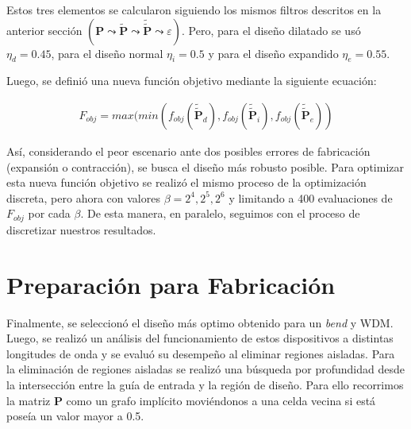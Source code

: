 Estos tres elementos se calcularon siguiendo los mismos filtros descritos en la anterior sección
$(\boldsymbol{P} \mathrel{\leadsto} \widetilde{\boldsymbol{P}} \mathrel{\leadsto}
\widetilde{\widetilde{\boldsymbol{P}}} \mathrel{\leadsto} \varepsilon)$.
Pero, para el diseño dilatado se usó $\eta_d = 0.45$, para el diseño normal $\eta_i = 0.5$ y
para el diseño expandido $\eta_e = 0.55$.

Luego, se definió una nueva función objetivo mediante la siguiente ecuación:

\begin{equation}
  \begin{split}
    F_{obj} = max(min(
    f_{obj}(\widetilde{\widetilde{\boldsymbol{P}}}_{d}),
    f_{obj}(\widetilde{\widetilde{\boldsymbol{P}}}_{i}),
    f_{obj}(\widetilde{\widetilde{\boldsymbol{P}}}_{e})
    )
  \end{split}
  \label{eq:final-fom}
\end{equation}

Así, considerando el peor escenario ante dos posibles errores de fabricación (expansión o contracción),
se busca el diseño más robusto posible.
Para optimizar esta nueva función objetivo se realizó el mismo proceso de la optimización discreta, pero ahora
con valores $\beta = 2^4, 2^5, 2^6$ y limitando a 400 evaluaciones de $F_{obj}$ por cada $\beta$. 
De esta manera, en paralelo, seguimos con el proceso de discretizar
nuestros resultados.

\section{Preparación para Fabricación}

Finalmente, se seleccionó el diseño más optimo obtenido para un \emph{bend} y WDM.
Luego, se realizó un análisis del funcionamiento de estos dispositivos a distintas longitudes de onda
y se evaluó su desempeño al eliminar regiones aisladas.
Para la eliminación de regiones aisladas se realizó una búsqueda por profundidad
desde la intersección entre la guía de entrada y la región de diseño.
Para ello recorrimos la matriz $\boldsymbol{P}$ como un grafo implícito moviéndonos a una celda
vecina si está poseía un valor mayor a 0.5.


